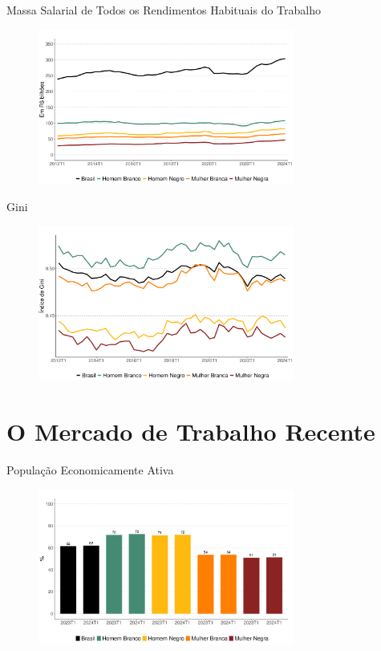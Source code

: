 \documentclass[10pt, xcolor=x11names,compress]{beamer}
\begin{document}
	
	\begin{frame}{Massa Salarial de Todos os Rendimentos Habituais do Trabalho}
		\begin{figure}
			\centering
			\includegraphics[width = 0.75\textwidth]{../figures_output/massa_habitual_br_gen_raca.pdf}
		\end{figure}
	\end{frame}
	
	
	\begin{frame}{Gini}
		\begin{figure}
			\centering
			\includegraphics[width = 0.75\textwidth]{../figures_output/gini_br_gen_raca.pdf}
		\end{figure}
	\end{frame}
	
	\section{O Mercado de Trabalho Recente}
	\begin{frame}{População Economicamente Ativa}
		\begin{figure}
			\centering
			\includegraphics[width = 0.75\textwidth]{../figures_output/pea.pdf}
		\end{figure}
	\end{frame}			
	
\end{document}
